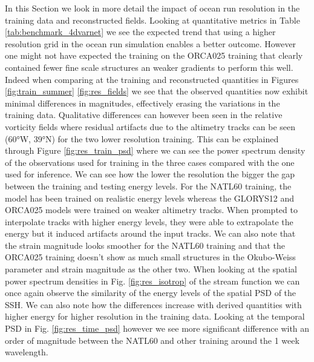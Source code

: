 \documentclass[draft]{agujournal2019}
\begin{document}
In this Section we look in more detail the impact of ocean run resolution in the training data and reconstructed fields. Looking at quantitative metrics in Table \ref{tab:benchmark_4dvarnet} we see the expected trend that using a higher resolution grid in the ocean run simulation enables a better outcome. However one might not have expected the training on the ORCA025 training that clearly contained fewer fine scale structures an weaker gradients to perform this well. Indeed when comparing at the training and reconstructed quantities in Figures \ref{fig:train_summer} \ref{fig:res_fields} we see that the observed quantities now exhibit minimal differences in magnitudes, effectively erasing the variations in the training data.
Qualitative differences can however been seen in the relative vorticity fields where residual artifacts due to the altimetry tracks can be seen (60°W, 39°N) for the two lower resolution training. This can be explained through Figure \ref{fig:res_train_psd} where we can see the power spectrum density of the observations used for training in the three cases compared with the one used for inference. We can see how the lower the resolution the bigger the gap between the training and testing energy levels. For the NATL60 training, the model has been trained on realistic energy levels whereas the GLORYS12 and ORCA025 models were trained on weaker altimetry tracks. When prompted to interpolate tracks with higher energy levels, they were able to extrapolate the energy but it induced artifacts around the input tracks. 
We can also note that the strain magnitude looks smoother for the NATL60 training and that the ORCA025 training doesn't show as much small structures in the Okubo-Weiss parameter and strain magnitude as the other two. 
When looking at the spatial power spectrum densities in Fig. \ref{fig:res_isotrop} of the stream function we can once again observe the similarity of the energy levels of the spatial PSD of the SSH. We can also note how the differences increase with derived quantities with higher energy for higher resolution in the training data.
Looking at the temporal PSD in Fig. \ref{fig:res_time_psd} however we see more significant difference with an order of magnitude between the NATL60 and other training around the 1 week wavelength. 
\end{document}
